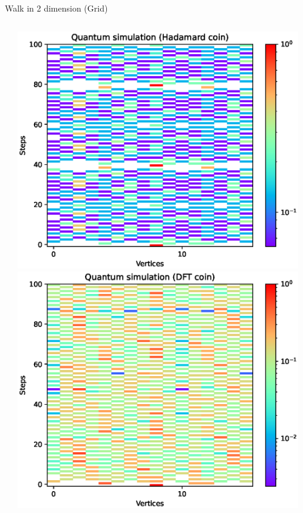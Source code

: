 \documentclass[aspectratio=169]{beamer}
\begin{document}
\begin{frame}{Walk in 2 dimension (Grid)}
\begin{columns}[onlytextwidth]
\begin{column}{.30\textwidth}
    \end{column}
    \begin{column}{.30\textwidth}
      \includegraphics[width=\textwidth]{./figures/results/grid_horizontal_vertical/hadamard.eps}
      \vspace{-1em} %
      \includegraphics[width=\textwidth]{./figures/results/grid_horizontal_vertical/dft.eps}
    \end{column}
    \begin{column}{.20\textwidth}
    \end{column}
  \end{columns}
\end{frame}
\end{document}

